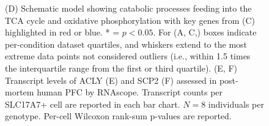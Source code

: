 \begin{figure}[ht]
{        (D) Schematic model showing catabolic processes feeding into the TCA cycle and oxidative phosphorylation with key genes from (C) highlighted in red or blue. * = $p<0.05$. For (A, C,) boxes indicate per-condition dataset quartiles, and whiskers extend to the most extreme data points not considered outliers (i.e., within 1.5 times the interquartile range from the first or third quartile). 
        (E, F) Transcript levels of ACLY (E) and SCP2 (F) assessed in post-mortem human PFC by RNAscope. Transcript counts per SLC17A7+ cell are reported in each bar chart. $N = 8$ individuals per genotype. Per-cell Wilcoxon rank-sum p-values are reported.
    }
    \label{fig:bulk_RNAseq_supplement}
\end{figure}